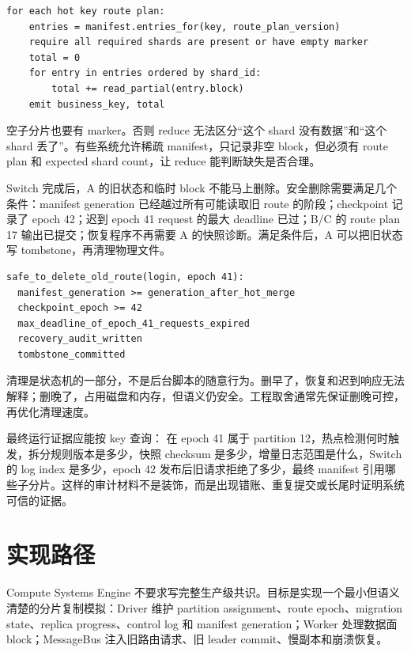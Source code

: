 \begin{lstlisting}[numbers=none,caption={二级 reduce 的语义伪代码}]
for each hot key route plan:
    entries = manifest.entries_for(key, route_plan_version)
    require all required shards are present or have empty marker
    total = 0
    for entry in entries ordered by shard_id:
        total += read_partial(entry.block)
    emit business_key, total
\end{lstlisting}

空子分片也要有 marker。否则 reduce 无法区分“这个 shard 没有数据”和“这个 shard 丢了”。有些系统允许稀疏 manifest，只记录非空 block，但必须有 route plan 和 expected shard count，让 reduce 能判断缺失是否合理。

Switch 完成后，A 的旧状态和临时 block 不能马上删除。安全删除需要满足几个条件：manifest generation 已经越过所有可能读取旧 route 的阶段；checkpoint 记录了 epoch 42；迟到 epoch 41 request 的最大 deadline 已过；B/C 的 route plan 17 输出已提交；恢复程序不再需要 A 的快照诊断。满足条件后，A 可以把旧状态写 tombstone，再清理物理文件。

\begin{lstlisting}[numbers=none,caption={旧 route 清理条件}]
safe_to_delete_old_route(login, epoch 41):
  manifest_generation >= generation_after_hot_merge
  checkpoint_epoch >= 42
  max_deadline_of_epoch_41_requests_expired
  recovery_audit_written
  tombstone_committed
\end{lstlisting}

清理是状态机的一部分，不是后台脚本的随意行为。删早了，恢复和迟到响应无法解释；删晚了，占用磁盘和内存，但语义仍安全。工程取舍通常先保证删晚可控，再优化清理速度。

最终运行证据应能按 key 查询： 在 epoch 41 属于 partition 12，热点检测何时触发，拆分规则版本是多少，快照 checksum 是多少，增量日志范围是什么，Switch 的 log index 是多少，epoch 42 发布后旧请求拒绝了多少，最终 manifest 引用哪些子分片。这样的审计材料不是装饰，而是出现错账、重复提交或长尾时证明系统可信的证据。

\section{实现路径}

Compute Systems Engine 不要求写完整生产级共识。目标是实现一个最小但语义清楚的分片复制模拟：Driver 维护 partition assignment、route epoch、migration state、replica progress、control log 和 manifest generation；Worker 处理数据面 block；MessageBus 注入旧路由请求、旧 leader commit、慢副本和崩溃恢复。

